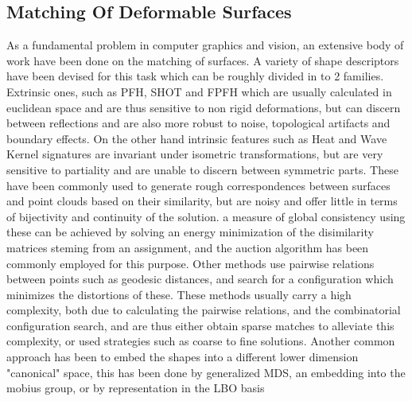 \documentclass[10pt,twocolumn,letterpaper]{article}
\begin{document}
\subsection{Matching Of Deformable Surfaces}
As a fundamental problem in computer graphics and vision, an extensive body of work have been done on the matching of surfaces.
A variety of shape descriptors have been devised for this task which can be roughly divided in to 2 families. 
Extrinsic ones, such as PFH\cite{rusu2008learning}, SHOT\cite{tombari2010unique} and FPFH\cite{rusu2009fast} which are usually calculated in euclidean space and are thus sensitive to non rigid deformations, but can discern between reflections and are also more robust to noise, topological artifacts and boundary effects.
On the other hand intrinsic features such as Heat\cite{bronstein2010scale} and Wave Kernel signatures\cite{aubry2011wave} are invariant under isometric transformations, but are very sensitive to partiality and are unable to discern between symmetric parts.
These have been commonly used to generate rough correspondences between surfaces and point clouds based on their similarity, but are noisy and offer little in terms of bijectivity and continuity of the solution. a measure of global consistency using these can be achieved by solving an energy minimization of the disimilarity matrices steming from an assignment, and the auction algorithm has been commonly employed for this purpose.
Other methods use pairwise relations between points such as geodesic distances\cite{sahilliouglu2012minimum,sahilliouglu2012scale,sahillioǧlu2011coarse}, and search for a configuration which minimizes the distortions of these. These methods usually carry a high complexity, both due to calculating the pairwise relations, and the combinatorial configuration search, and are thus either obtain sparse matches\cite{sahilliouglu2012minimum,sahilliouglu2012scale,sahillioǧlu2011coarse} to alleviate this complexity, or used strategies such as coarse to fine solutions.
Another common approach has been to embed the shapes into a different lower dimension "canonical"  space, this has been done by generalized MDS\cite{bronstein2006generalized}, an embedding into the mobius group\cite{lipman2009mobius}, or by representation in the LBO basis\cite{shtern2014matching}
\end{document}
